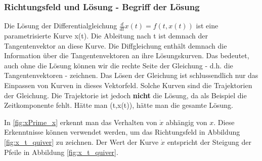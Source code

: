 \subsubsection{Richtungsfeld und Lösung - Begriff der Lösung}
Die Lösung der Differentialgleichung $\frac{d}{dt}x(t) = f(t,x(t))$ ist eine parametrisierte Kurve x(t). Die Ableitung nach t ist demnach der Tangentenvektor an diese Kurve. Die Diffgleichung enthält demnach die Information über die Tangentenvektoren an ihre Lösungskurven. 
Das bedeutet, auch ohne die Lösung können wir die rechte Seite der Gleichung - d.h. die Tangentenvektoren - zeichnen. Das Lösen der Gleichung ist schlussendlich nur das Einpassen von Kurven in dieses Vektorfeld. Solche Kurven sind die Trajektorien der Gleichung. Die Trajektorie ist jedoch \textbf{nicht} die Lösung, da als Beispiel die Zeitkomponente fehlt. Hätte man (t,x(t)), hätte man die gesamte Lösung.
 
 \vspace{0.5cm}
 
 In \ref{fig:xPrime_x} erkennt man das Verhalten von $\dot{x}$ abhängig von $x$. Diese Erkenntnisse können verwendet werden, um das Richtungsfeld in Abbildung \ref{fig:x_t_quiver} zu zeichnen. Der Wert der Kurve $\dot{x}$ entspricht der Steigung der Pfeile in Abbildung \ref{fig:x_t_quiver}.
 
